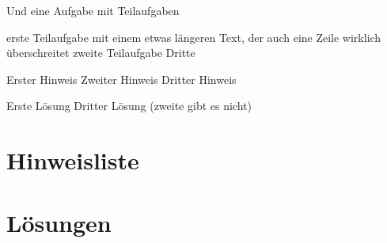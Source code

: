 \documentclass[12pt,a4paper,parskip=half,chapterprefix,bibliography=totoc,footheight=57pt,numbers=noendperiod]{scrreprt}
\begin{document}
    Und eine Aufgabe mit Teilaufgaben
    \begin{aufgabe}
        \begin{teilaufgaben}
            \teilaufgabe erste Teilaufgabe mit einem etwas längeren Text, der auch eine Zeile wirklich überschreitet
            \TextFeld{3cm}
            \teilaufgabe zweite Teilaufgabe
            \TextFeld{3cm}
            \teilaufgabe Dritte
        \end{teilaufgaben}
        \begin{bearbeitungshinweis}
            \begin{teilaufgaben}
                \teilaufgabe Erster Hinweis
                \teilaufgabe Zweiter Hinweis
                \teilaufgabe Dritter Hinweis
            \end{teilaufgaben}
        \end{bearbeitungshinweis}
        \begin{loesung}
            \begin{teilaufgaben}
                \teilaufgabe Erste Lösung
                \teilaufgabeOhneLoesung
                \teilaufgabe Dritter Lösung (zweite gibt es nicht)
            \end{teilaufgaben}
        \end{loesung}
    \end{aufgabe}

\chapter{Hinweisliste}
    \bearbeitungshinweisliste

\chapter{Lösungen}
    \printsolutions

\printbibliography
\end{document}
